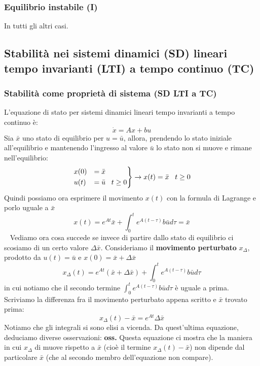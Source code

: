 \subsubsection{Equilibrio instabile (I)}
In tutti gli altri casi.
\subsection{Stabilità nei sistemi dinamici (SD) lineari tempo invarianti (LTI) a tempo continuo (TC)}
\subsubsection{Stabilità come proprietà di sistema (SD LTI a TC)}
L'equazione di stato per sistemi dinamici lineari tempo invarianti a tempo continuo è:
\[
    \dot{x} = Ax + bu
\]
Sia $\bar{x}$ uno stato di equilibrio per $u = \bar{u}$, allora, prendendo lo stato iniziale all'equilibrio e mantenendo l'ingresso al valore $\bar{u}$ lo stato non si muove e rimane nell'equilibrio:
\[
    \begin{rcases}
        x(0) &= \bar{x}\\
        u(t) &= \bar{u} \;\;\; t\geq 0
    \end{rcases} \rightarrow  x(t) = \bar{x} \;\;\;t \geq 0
\]
Quindi possiamo ora esprimere il movimento $x(t)$ con la formula di Lagrange e porlo uguale a $\bar{x}$
\[
    x(t) = e^{At} \bar{x} + \int_{0}^{t}e^{A(t-\tau)} b \bar{u} d \tau = \bar{x}
\]
\ \newline 
Vediamo ora cosa succede se invece di partire dallo stato di equilibrio ci scosiamo di un certo valore $\Delta \bar{x}$. Consideriamo il \textbf{movimento perturbato} $x_{\Delta}$, prodotto da $u(t) = \bar{u}$ e $x(0) = \bar{x} + \Delta \bar{x}$
\[
    x_{\Delta}(t) = e^{At}(\bar{x} + \Delta \bar{x}) + \int_{0}^{t}e^{A(t- \tau)}b \bar{u} d \tau
\]
in cui notiamo che il secondo termine $\int_{0}^{t}e^{A(t- \tau)}b \bar{u} d \tau$ è uguale a prima.\newline
\newline
Scriviamo la differenza fra il movimento perturbato appena scritto e $\bar{x}$ trovato prima:
\[
    x_\Delta (t) - \bar{x} = e^{At} \Delta \bar{x}
\]
Notiamo che gli integrali si sono elisi a vicenda.\newline
\newline
Da quest'ultima equazione, deduciamo diverse osservazioni:\newline
\newline
\textbf{oss.} Questa equazione ci mostra che la maniera in cui $x_\Delta$ di muove rispetto a $\bar{x}$ (cioè il termine $x_\Delta (t) - \bar{x}$) non dipende dal particolare $\bar{x}$ (che al secondo membro dell'equazione non compare).\newline
